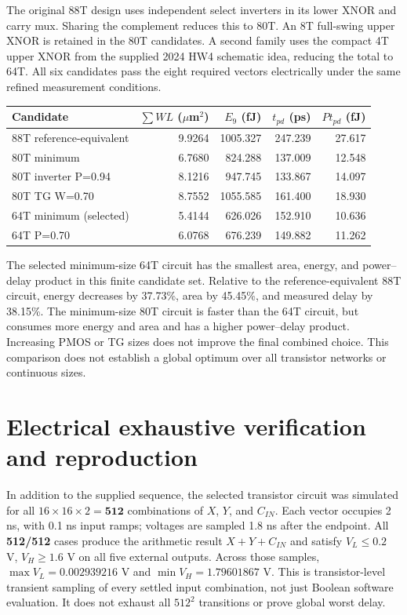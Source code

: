 \documentclass[11pt,a4paper]{article}
\begin{document}
The original 88T design uses independent select inverters in its lower
XNOR and carry mux. Sharing the complement reduces this to 80T. An 8T
full-swing upper XNOR is retained in the 80T candidates. A second family
uses the compact 4T upper XNOR from the supplied 2024 HW4 schematic idea,
reducing the total to 64T. All six candidates pass the eight required
vectors electrically under the same refined measurement conditions.

\begin{center}\small
\begin{tabular}{lrrrr}\toprule
Candidate & $\sum WL$ ($\mu$m$^2$) & $E_9$ (fJ) & $t_{pd}$ (ps) & $P t_{pd}$ (fJ)\\\midrule
88T reference-equivalent & 9.9264 & 1005.327 & 247.239 & 27.617 \\
80T minimum & 6.7680 & 824.288 & 137.009 & 12.548 \\
80T inverter P=0.94 & 8.1216 & 947.745 & 133.867 & 14.097 \\
80T TG W=0.70 & 8.7552 & 1055.585 & 161.400 & 18.930 \\
64T minimum (selected) & 5.4144 & 626.026 & 152.910 & 10.636 \\
64T P=0.70 & 6.0768 & 676.239 & 149.882 & 11.262 \\
\bottomrule\end{tabular}\end{center}
The selected minimum-size 64T circuit has the smallest area, energy,
and power--delay product in this finite candidate set. Relative to the
reference-equivalent 88T circuit, energy decreases by 37.73\%, area by
45.45\%, and measured delay by 38.15\%. The minimum-size 80T circuit is
faster than the 64T circuit, but consumes more energy and area and has a
higher power--delay product. Increasing PMOS or TG sizes does not improve
the final combined choice. This comparison does not establish a global
optimum over all transistor networks or continuous sizes.

\newpage
\section{Electrical exhaustive verification and reproduction}
In addition to the supplied sequence, the selected transistor circuit was
simulated for all $16\times16\times2=\textbf{512}$ combinations of $X$, $Y$,
and $C_{IN}$. Each vector occupies 2 ns, with 0.1 ns input ramps;
voltages are sampled 1.8 ns after the endpoint. All \textbf{512/512} cases
produce the arithmetic result $X+Y+C_{IN}$ and satisfy $V_L\leq0.2$ V,
$V_H\geq1.6$ V on all five external outputs. Across those samples,
$\max V_L=0.002939216$ V and $\min V_H=1.79601867$ V.
This is transistor-level transient sampling of every settled input
combination, not just Boolean software evaluation. It does not exhaust
all $512^2$ transitions or prove global worst delay.
\end{document}
